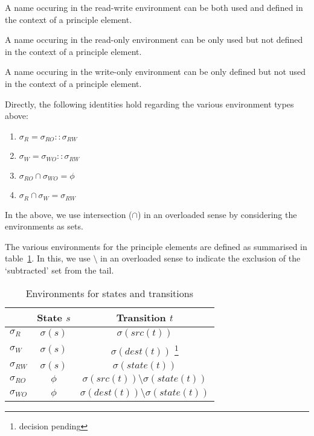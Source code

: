 \documentclass[12pt,a4paper]{article}
\begin{document}
\begin{definition}
	A name occuring in the read-write environment can be both used and defined in the context of a principle element. 
\end{definition}


\begin{definition}
	A name occuring in the read-only environment can be only used but not defined in the context of a principle element. 
\end{definition}


\begin{definition}
	A name occuring in the write-only environment can be only defined but not used in the context of a principle element. 
\end{definition}

Directly, the following identities hold regarding the various environment types above:
\begin{enumerate}
	\item $\sigma_R = \sigma_{RO} :: \sigma_{RW}$
	\item $\sigma_W = \sigma_{WO} :: \sigma_{RW}$
	\item $\sigma_{RO} \cap \sigma_{WO} = \phi$
	\item $\sigma_{R} \cap \sigma_{W} = \sigma_{RW}$
\end{enumerate}

In the above, we use intersection ($\cap$) in an overloaded sense by considering the environments as sets.

The various environments for the principle elements are defined as summarised in table~\ref{t:env}. In this, we use $\setminus$ in an overloaded sense to indicate the exclusion of the `subtracted' set from the tail.
 
\begin{table}
\begin{center}
\begin{tabular}{| l | c | c |}
\hline
	          & \textbf{State} $s$   & \textbf{Transition} $t$ \\
\hline
	$\sigma_R$ & $\sigma(s)$ & $\sigma(src(t))$ \\
	$\sigma_W$ & $\sigma(s)$ & $\sigma(dest(t))$ \footnote{decision pending} \\
	$\sigma_{RW}$ & $\sigma(s)$ & $\sigma(state(t))$ \\
	$\sigma_{RO}$ & $\phi$ & $\sigma(src(t)) \setminus \sigma(state(t))$ \\
	$\sigma_{WO}$ & $\phi$ & $\sigma(dest(t)) \setminus \sigma(state(t))$ \\
\hline
\end{tabular}
\end{center}
\caption{Environments for states and transitions}
\label{t:env}
\end{table}
\end{document}
